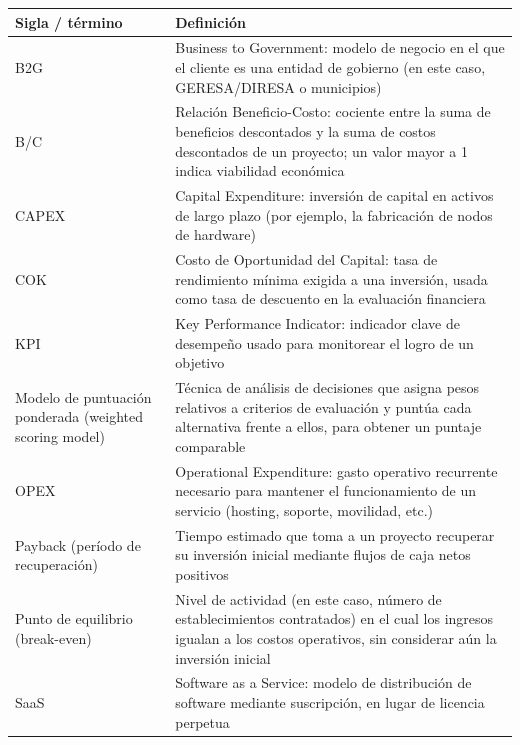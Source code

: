 \documentclass[11pt,a4paper]{article}
\begin{document}
{\small
\begin{longtable}[]{@{}
  >{\raggedright\arraybackslash}p{}
  >{\raggedright\arraybackslash}p{}@{}}
\toprule\noalign{}
\begin{minipage}[b]{\linewidth}\raggedright
Sigla / término
\end{minipage} & \begin{minipage}[b]{\linewidth}\raggedright
Definición
\end{minipage} \\
\midrule\noalign{}
\endhead
\bottomrule\noalign{}
\endlastfoot
B2G & Business to Government: modelo de negocio en el que el cliente es una entidad de gobierno (en este caso, GERESA/DIRESA o municipios) \\
B/C & Relación Beneficio-Costo: cociente entre la suma de beneficios descontados y la suma de costos descontados de un proyecto; un valor mayor a 1 indica viabilidad económica \\
CAPEX & Capital Expenditure: inversión de capital en activos de largo plazo (por ejemplo, la fabricación de nodos de hardware) \\
COK & Costo de Oportunidad del Capital: tasa de rendimiento mínima exigida a una inversión, usada como tasa de descuento en la evaluación financiera \\
KPI & Key Performance Indicator: indicador clave de desempeño usado para monitorear el logro de un objetivo \\
Modelo de puntuación ponderada (weighted scoring model) & Técnica de análisis de decisiones que asigna pesos relativos a criterios de evaluación y puntúa cada alternativa frente a ellos, para obtener un puntaje comparable \\
OPEX & Operational Expenditure: gasto operativo recurrente necesario para mantener el funcionamiento de un servicio (hosting, soporte, movilidad, etc.) \\
Payback (período de recuperación) & Tiempo estimado que toma a un proyecto recuperar su inversión inicial mediante flujos de caja netos positivos \\
Punto de equilibrio (break-even) & Nivel de actividad (en este caso, número de establecimientos contratados) en el cual los ingresos igualan a los costos operativos, sin considerar aún la inversión inicial \\
SaaS & Software as a Service: modelo de distribución de software mediante suscripción, en lugar de licencia perpetua \\

\end{longtable}}
\end{document}
